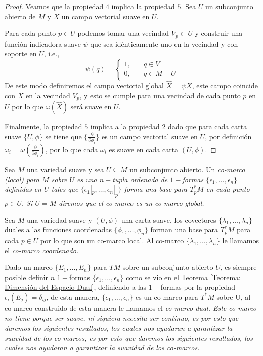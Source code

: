 \begin{proof}
	Veamos que la propiedad $4$ implica la propiedad $5$. Sea $U$ un subconjunto abierto de $M$ y $X$ un campo vectorial suave en $U$.

	Para cada punto $p \in U$ podemos tomar una vecindad $V_p \subset U$ y construir una función indicadora suave $\psi$ que sea idénticamente uno en la vecindad y con soporte en $U$, i.e.,
	\[
		\psi(q) = \begin{cases}
			1, \quad & q \in V     \\
			0, \quad & q \in M - U
		\end{cases}
	\]
	De este modo definiremos el campo vectorial global $\hat{X} = \psi X$, este campo coincide con $X$ en la vecindad $V_p$, y esto se cumple para una vecindad de cada punto $p$ en $U$ por lo que $\omega(\hat{X})$ será suave en $U$.

	Finalmente, la propiedad $5$ implica a la propiedad $2$ dado que para cada carta suave $\{U,\phi\}$ se tiene que $\{\frac{\partial}{\partial \phi_i}\}$ es un campo vectorial suave en $U$, por definición $\omega_i = \omega(\frac{\partial}{\partial \phi_i})$, por lo que cada $\omega_i$ es suave en cada carta $(U,\phi)$.
\end{proof}

\begin{definition}
	Sea $M$ una variedad suave y sea $U \subseteq M$ un subconjunto abierto. Un \it{co-marco (local) para $M$ sobre $U$} es una $n-$tupla ordenada de $1-$formas $\{\epsilon_1, \ldots, \epsilon_n\}$ definidas en $U$ tales que $\{\epsilon_1|_p, \ldots, \epsilon_n|_p\}$ forma una base para $T_{p}^{*}M$ en cada punto $p \in U$. Si $U = M$ diremos que el co-marco es un \it{co-marco global}.
\end{definition}

\begin{example}
	Sea $M$ una variedad suave y $(U,\phi)$ una carta suave, los covectores $\{\lambda_1, \ldots, \lambda_n\}$ duales a las funciones coordenadas $\{\phi_1, \ldots, \phi_n\}$ forman una base para $T_p^* M$ para cada $p \in U$ por lo que son un co-marco local. Al co-marco $\{\lambda_1, \ldots, \lambda_n\}$ le llamamos el \it{co-marco coordenado}.
\end{example}

Dado un marco $\{E_1, \ldots, E_n\}$ para $TM$ sobre un subconjunto abierto $U$, es siempre posible definir $n$ $1-$formas $\{\epsilon_1, \ldots, \epsilon_n\}$ como se vio en el Teorema \ref{Teorema: Dimensión del Espacio Dual}, definiendo a las $1-$formas por la propiedad $\epsilon_i(E_j) = \delta_{ij}$, de esta manera, $\{\epsilon_1,\ldots,\epsilon_n\}$ es un co-marco para $T^*M$ sobre U, al co-marco construido de esta manera le llamamos el \it{co-marco dual}. Este co-marco no tiene porque ser suave, ni siquiera necesita ser continuo, es por esto que daremos los siguientes resultados, los cuales nos ayudaran a garantizar la suavidad de los co-marcos, es por esto que daremos los siguientes resultados, los cuales nos ayudaran a garantizar la suavidad de los co-marcos.

